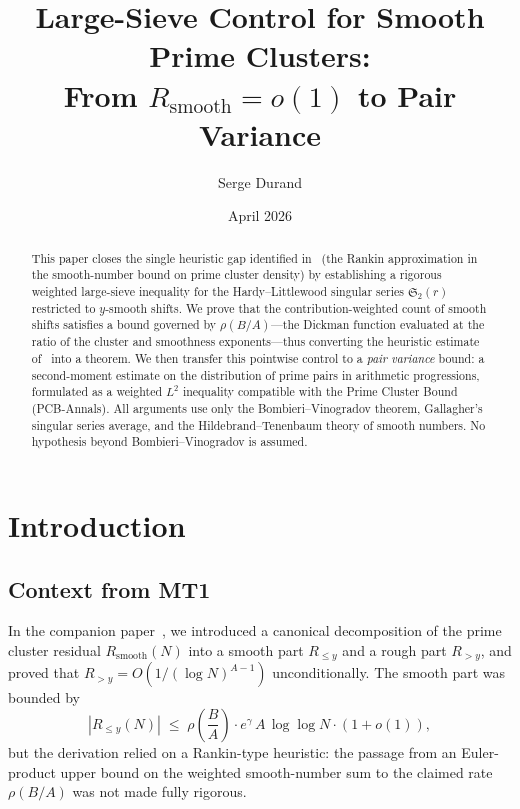 \documentclass[11pt,reqno]{amsart}
\theoremstyle{plain}
\theoremstyle{definition}
\theoremstyle{remark}
\newcommand{\Rsmooth}{R_{\mathrm{smooth}}}
\newcommand{\Sfrak}{\mathfrak{S}_2}
\begin{document}
\title[Large-Sieve Control for Smooth Prime Clusters]
{Large-Sieve Control for Smooth Prime Clusters:\\[2pt]
From $R_{\mathrm{smooth}} = o(1)$ to Pair Variance}

\author{Serge Durand}
\address{Independent Researcher, Paris, France}

\date{April 2026}

\begin{abstract}
This paper closes the single heuristic gap identified in~\cite{MT1}
(the Rankin approximation in the smooth-number bound on prime cluster
density) by establishing a rigorous weighted large-sieve inequality
for the Hardy--Littlewood singular series $\Sfrak(r)$ restricted to
$y$-smooth shifts. We prove that the contribution-weighted count of
smooth shifts satisfies a bound governed by $\rho(B/A)$---the Dickman
function evaluated at the ratio of the cluster and smoothness
exponents---thus converting the heuristic estimate of~\cite{MT1}
into a theorem. We then transfer this pointwise control to a
\emph{pair variance} bound: a second-moment estimate on the
distribution of prime pairs in arithmetic progressions, formulated
as a weighted $L^2$ inequality compatible with the Prime Cluster
Bound (PCB-Annals). All arguments use only the Bombieri--Vinogradov
theorem, Gallagher's singular series average, and the
Hildebrand--Tenenbaum theory of smooth numbers. No hypothesis
beyond Bombieri--Vinogradov is assumed.
\end{abstract}

\maketitle
\setcounter{tocdepth}{2}
\tableofcontents

\section{Introduction}\label{sec:intro}

\subsection{Context from MT1}

In the companion paper~\cite{MT1}, we introduced a canonical
decomposition of the prime cluster residual $\Rsmooth(N)$ into
a smooth part $R_{\le y}$ and a rough part $R_{>y}$, and proved
that $R_{>y} = O(1/(\log N)^{A-1})$ unconditionally. The smooth part
was bounded by
\begin{equation}\label{eq:MT1_bound}
  |R_{\le y}(N)| \;\le\;
  \rho\!\left(\frac{B}{A}\right) \cdot e^{\gamma}\, A\, \log\log N
  \cdot (1 + o(1)),
\end{equation}
but the derivation relied on a Rankin-type heuristic: the passage
from an Euler-product upper bound on the weighted smooth-number sum
to the claimed rate $\rho(B/A)$ was not made fully rigorous.
\end{document}

